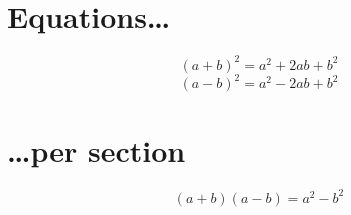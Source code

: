 \documentclass{article}
\begin{document}
  \section{Equations\ldots}
  \begin{equation}
    (a+b)^2 = a^2 + 2ab + b^2
  \end{equation}
  \begin{equation}
    (a-b)^2 = a^2 - 2ab + b^2
  \end{equation}

  \section{\ldots per section}
  \begin{equation}
    (a+b)(a-b) = a^2 - b^2
  \end{equation}
\end{document}

